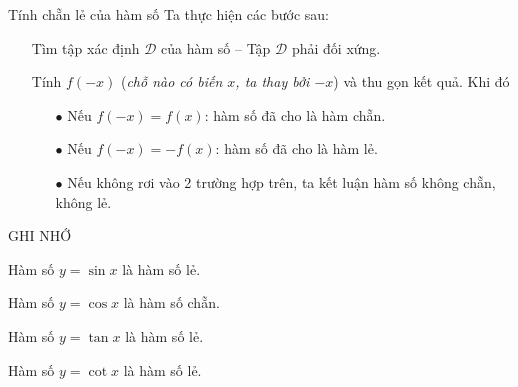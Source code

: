 \begin{dang}{Tính chẵn lẻ của hàm số}
	Ta thực hiện các bước sau: 
	\begin{enumerate}
		\item[\ding{172}] Tìm tập xác định $\mathscr{D}$ của hàm số -- Tập $\mathscr{D}$ phải đối xứng.
		\item[\ding{173}] Tính $f\left(-x\right)$ (\textit{chỗ nào có biến $x$, ta thay bởi $-x$}) và thu gọn kết quả. Khi đó 
		\begin{itemize}
			\item [$\bullet$] Nếu $f(-x)=f(x)$: hàm số đã cho là hàm chẵn.
			\item [$\bullet$] Nếu $f(-x)=-f(x)$: hàm số đã cho là hàm lẻ.
			\item [$\bullet$] Nếu không rơi vào 2 trường hợp trên, ta kết luận hàm số không chẵn, không lẻ.
		\end{itemize}
	\end{enumerate}
	
	\begin{khung4}{GHI NHỚ}
		\begin{listEX}[2]
			\item [\ding{172}] Hàm số $y=\sin x$ là hàm số lẻ.
			\item [\ding{173}] Hàm số $y=\cos x$ là hàm số chẵn.
			\item [\ding{174}] Hàm số $y=\tan x$ là hàm số lẻ.
			\item [\ding{175}] Hàm số $y=\cot x$ là hàm số lẻ.
		\end{listEX}
	\end{khung4}	
\end{dang}

